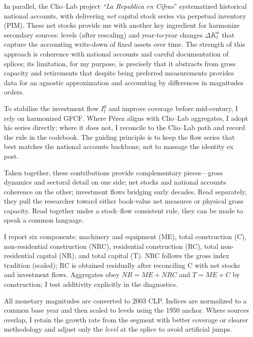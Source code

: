 In parallel, the Clio--Lab project \textit{``La Republica en Cifras}'' \citep{Luders2016} systematized historical national accounts, with \citet{Diaz2016} delivering \emph{net} capital stock series via perpetual inventory (PIM). These net stocks provide me with another key ingredient for harmonize secondary sources: levels (after rescaling) and year-to-year changes $\Delta K^n_t$ that capture the accounting write-down of fixed assets over time. The strength of this approach is coherence with national accounts and careful documentation of splices; its limitation, for my purpose, is precisely that it abstracts from gross capacity and retirements that despite being preferred measurements provides data for an agnostic approximation and accounting by differences in magnitudes orders.  

To stabilize the investment flow $I^g_t$ and improve coverage before mid-century, I rely on \citet{PerezEyzaguirre2019} harmonized GFCF. Where Pérez aligns with Clio--Lab aggregates, I adopt his series directly; where it does not, I reconcile to the Clio--Lab path and record the rule in the codebook. The guiding principle is to keep the flow series that best matches the national accounts backbone, not to massage the identity ex post.

Taken together, these contributions provide complementary pieces—gross dynamics and sectoral detail on one side; net stocks and national accounts coherence on the other; investment flows bridging early decades. Read separately, they pull the researcher toward either book-value net measures or physical gross capacity. Read together under a stock–flow consistent rule, they can be made to speak a common language.

I report six components: machinery and equipment (ME), total construction (C), non-residential construction (NRC), residential construction (RC), total non-residential capital (NR), and total capital (T). NRC follows the gross index tradition (scaled); RC is obtained residually after reconciling C with net stocks and investment flows. Aggregates obey $NR = ME + NRC$ and $T = ME + C$ by construction; I test additivity explicitly in the diagnostics.

All monetary magnitudes are converted to 2003 CLP. Indices are normalized to a common base year and then scaled to levels using the \citet{Hofman2000} 1950 anchor. Where sources overlap, I retain the growth rate from the segment with better coverage or clearer methodology and adjust only the \emph{level} at the splice to avoid artificial jumps.

